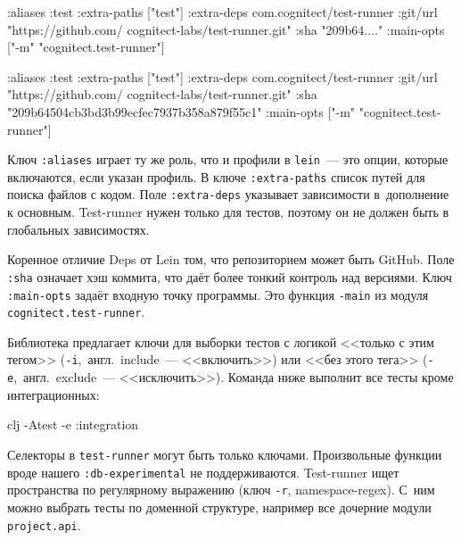 \ifnarrow

\begin{english}
  \begin{clojure}
:aliases
{:test
 {:extra-paths ["test"]
  :extra-deps
  {com.cognitect/test-runner
   {:git/url
    "https://github.com/
         cognitect-labs/test-runner.git"
    :sha "209b64...."}}
  :main-opts
  ["-m" "cognitect.test-runner"]}}
  \end{clojure}
\end{english}

\else

\begin{english}
  \begin{clojure}
:aliases
{:test
 {:extra-paths ["test"]
  :extra-deps
  {com.cognitect/test-runner
   {:git/url "https://github.com/
              cognitect-labs/test-runner.git"
    :sha "209b64504cb3bd3b99ecfec7937b358a879f55c1"}}
  :main-opts ["-m" "cognitect.test-runner"]}}
  \end{clojure}
\end{english}

\fi


Ключ \verb|:aliases| играет ту же роль, что и профили в \verb|lein|~--- это
опции, которые включаются, если указан профиль. В ключе \verb|:extra-paths|
список путей для поиска файлов с кодом. Поле \verb|:extra-deps| указывает
зависимости в~дополнение к основным. Test-runner нужен только для тестов,
поэтому он не должен быть в глобальных зависимостях.

Коренное отличие Deps от Lein том, что репозиторием может быть GitHub. Поле
\verb|:sha| означает хэш коммита, что даёт более тонкий контроль над
версиями. Ключ \verb|:main-opts| задаёт входную точку программы. Это функция
\verb|-main| из модуля \verb|cognitect.test-runner|.

Библиотека предлагает ключи для выборки тестов с логикой <<только с этим тегом>>
(\verb|-i|,~англ.~include~--- <<включить>>) или <<без этого тега>>
(\verb|-e|,~англ.~exclude~--- <<исключить>>). Команда ниже выполнит все тесты кроме
интеграционных:

\begin{english}
  \begin{bash}
clj -Atest -e :integration
  \end{bash}
\end{english}

Селекторы в \verb|test-runner| могут быть только ключами. Произвольные функции
вроде нашего \verb|:db-experimental| не поддерживаются. Test-runner ищет
пространства по регулярному выражению (ключ \verb|-r|, namespace-regex). С~ним
можно выбрать тесты по доменной структуре, например все дочерние модули
\verb|project.api|.


